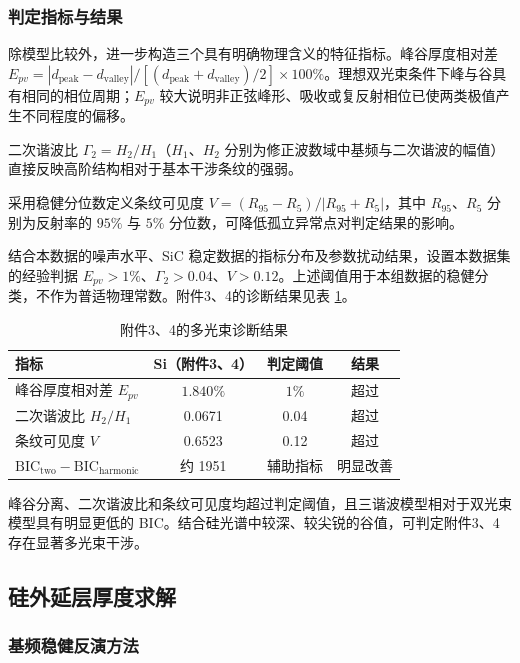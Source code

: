 \documentclass[withoutpreface,bwprint]{cumcmthesis}
\begin{document}
\subsubsection{判定指标与结果}

除模型比较外，进一步构造三个具有明确物理含义的特征指标。峰谷厚度相对差 $E_{pv}=|d_{\mathrm{peak}}-d_{\mathrm{valley}}|/[(d_{\mathrm{peak}}+d_{\mathrm{valley}})/2]\times100\%$。理想双光束条件下峰与谷具有相同的相位周期；$E_{pv}$ 较大说明非正弦峰形、吸收或复反射相位已使两类极值产生不同程度的偏移。

二次谐波比 $\Gamma_2=H_2/H_1$（$H_1$、$H_2$ 分别为修正波数域中基频与二次谐波的幅值）直接反映高阶结构相对于基本干涉条纹的强弱。

采用稳健分位数定义条纹可见度 $V=(R_{95}-R_5)/|R_{95}+R_5|$，其中 $R_{95}$、$R_5$ 分别为反射率的 $95\%$ 与 $5\%$ 分位数，可降低孤立异常点对判定结果的影响。

结合本数据的噪声水平、SiC 稳定数据的指标分布及参数扰动结果，设置本数据集的经验判据 $E_{pv}>1\%$、$\Gamma_2>0.04$、$V>0.12$。上述阈值用于本组数据的稳健分类，不作为普适物理常数。附件3、4的诊断结果见表 \ref{tab:q3_multibeam_diagnostics}。

\begin{table}[htbp]
	\centering
	\caption{附件3、4的多光束诊断结果}
	\label{tab:q3_multibeam_diagnostics}
	\begin{tabular}{lccc}
		\toprule
		指标 & Si（附件3、4） & 判定阈值 & 结果 \\
		\midrule
		峰谷厚度相对差 $E_{pv}$ & $1.840\%$ & $1\%$ & 超过 \\
		二次谐波比 $H_2/H_1$ & 0.0671 & 0.04 & 超过 \\
		条纹可见度 $V$ & 0.6523 & 0.12 & 超过 \\
		$\mathrm{BIC}_{\mathrm{two}}-\mathrm{BIC}_{\mathrm{harmonic}}$
		& 约 1951 & 辅助指标 & 明显改善 \\
		\bottomrule
	\end{tabular}
\end{table}

峰谷分离、二次谐波比和条纹可见度均超过判定阈值，且三谐波模型相对于双光束模型具有明显更低的 BIC。结合硅光谱中较深、较尖锐的谷值，可判定附件3、4存在显著多光束干涉。

\subsection{硅外延层厚度求解}
\label{subsec:q3_si_thickness}

\subsubsection{基频稳健反演方法}
\end{document}
